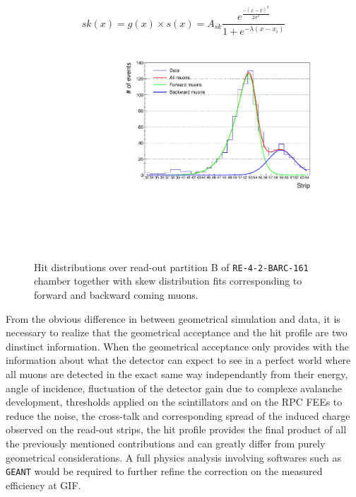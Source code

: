 	\begin{equation}
	\label{eq:skew}
	sk(x) = g(x)\times s(x) = A_{sk}\frac{e^{\frac{-(x-\bar{x})^2}{2\sigma^2}}}{1+e^{-\lambda(x-x_i)}}
	\end{equation}

	\begin{figure}[H]
            \centering
		\includegraphics[width = 0.7\plotwidth]{fig/chapt5/Cosmic-data-21-skew-fit.pdf}
		\caption{\label{fig:Fit-data} Hit distributions over read-out partition B of \texttt{RE-4-2-BARC-161} chamber together with skew distribution fits corresponding to forward and backward coming muons.}
	\end{figure}
	
	From the obvious difference in between geometrical simulation and data, it is necessary to realize that the geometrical acceptance and the hit profile are two dinstinct information. When the geometrical acceptance only provides with the information about what the detector can expect to see in a perfect world where all muons are detected in the exact same way independantly from their energy, angle of incidence, fluctuation of the detector gain due to complexe avalanche development, thresholds applied on the scintillators and on the RPC FEEs to reduce the noise, the cross-talk and corresponding spread of the induced charge observed on the read-out strips, the hit profile provides the final product of all the previously mentioned contributions and can greatly differ from purely geometrical considerations. A full physics analysis involving softwares such as \texttt{GEANT} would be required to further refine the correction on the measured efficiency at GIF.
	
